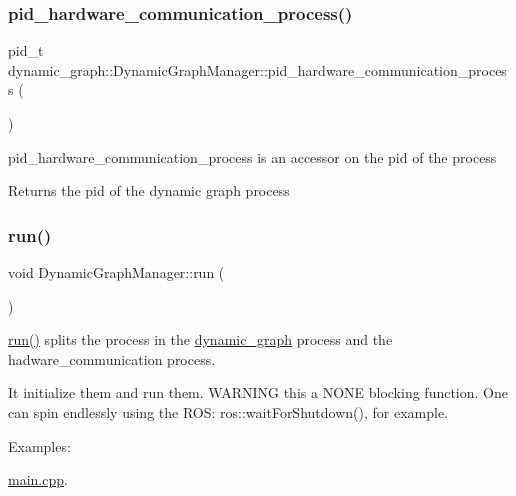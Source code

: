 \subsubsection{\texorpdfstring{pid\+\_\+hardware\+\_\+communication\+\_\+process()}{pid\_hardware\_communication\_process()}}
{\footnotesize\ttfamily pid\+\_\+t dynamic\+\_\+graph\+::\+Dynamic\+Graph\+Manager\+::pid\+\_\+hardware\+\_\+communication\+\_\+process (\begin{DoxyParamCaption}{ }\end{DoxyParamCaption})\hspace{0.3cm}{\ttfamily [inline]}}



pid\+\_\+hardware\+\_\+communication\+\_\+process is an accessor on the pid of the process 

\begin{DoxyReturn}{Returns}
the pid of the dynamic graph process 
\end{DoxyReturn}
\mbox{\label{classdynamic__graph_1_1DynamicGraphManager_a93272fcbb3793dfc92422186022ecf72}} 
\subsubsection{\texorpdfstring{run()}{run()}}
{\footnotesize\ttfamily void Dynamic\+Graph\+Manager\+::run (\begin{DoxyParamCaption}{ }\end{DoxyParamCaption})}



\hyperlink{classdynamic__graph_1_1DynamicGraphManager_a93272fcbb3793dfc92422186022ecf72}{run()} splits the process in the \hyperlink{namespacedynamic__graph}{dynamic\+\_\+graph} process and the hadware\+\_\+communication process. 

It initialize them and run them. W\+A\+R\+N\+I\+NG this a N\+O\+NE blocking function. One can spin endlessly using the R\+OS\+: ros\+::wait\+For\+Shutdown(), for example. \begin{Desc}
\item[Examples\+: ]\par
\hyperlink{main_8cpp-example}{main.\+cpp}.\end{Desc}
\mbox{\label{classdynamic__graph_1_1DynamicGraphManager_a8e23eb4ce0acaef397bf84a770b9f015}} 
